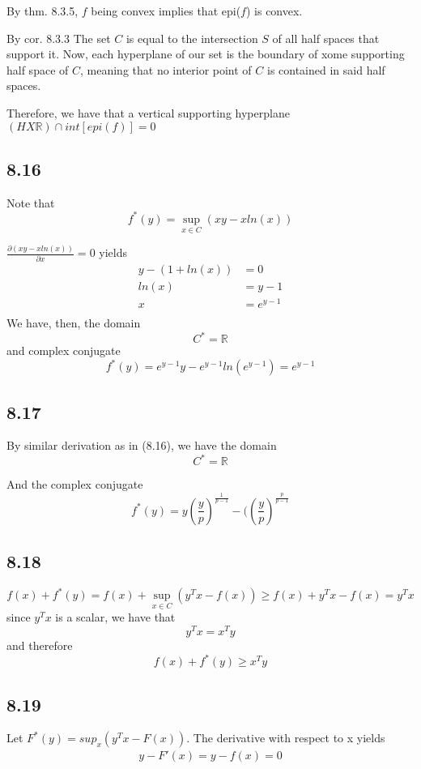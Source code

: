 \documentclass[letterpaper,12pt]{article}
\theoremstyle{definition}
\begin{document}
By thm. 8.3.5, $f$ being convex implies that epi($f$) is convex.

By cor. 8.3.3 The set $C$ is equal to the intersection $S$ of all half spaces that support it. Now, each hyperplane of our set is the boundary of xome supporting half space of $C$, meaning that no interior point of $C$ is contained in said half spaces. 

Therefore, we have that a vertical supporting hyperplane $(HX\mathbb{R})\cap int[epi(f)]=0$


\subsection*{8.16}
Note that
\[ f^*(y) = \sup_{x \in C} (xy - xln(x))\]

$\frac{\partial(xy-xln(x))}{\partial x}=0$ yields
\begin{align*}
 y - (1+ln(x)) &= 0\\
 ln(x) &= y-1 \\
 x &= e^{y-1} \\
\end{align*}
We have, then, the domain \[C^* = \mathds{R}\] and complex conjugate
\[f^*(y) = e^{y-1}y - e^{y-1}ln(e^{y-1}) = e^{y-1} \]

\subsection*{8.17}

By similar derivation as in (8.16), we have the domain \[C^* = \mathbb{R}\]


And the complex conjugate \[f^*(y) = y (\frac{y}{p})^{\frac{1}{p-1}} - ((\frac{y}{p})^{\frac{p}{p-1}} \]

\subsection*{8.18}

\[f(x)+f^*(y)=f(x)+\sup_{x \in C}(y^Tx-f(x)) \ge f(x)+y^Tx-f(x)=y^Tx\]
since $y^Tx$ is a scalar, we have that  \[y^Tx=x^Ty\] and therefore
\[f(x)+f^*(y) \ge x^Ty\]

\subsection*{8.19}
Let $F^*(y)=sup_x (y^Tx-F(x))$. The derivative with respect to x yields \\

\begin{align*}
y-F'(x)=y-f(x)=0
\end{align*}\\
\end{document}
